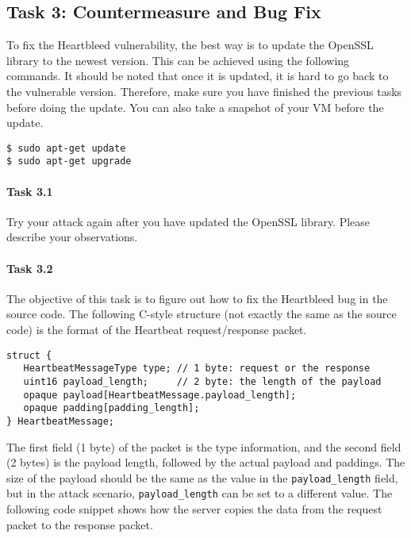 \subsection{Task 3: Countermeasure and Bug Fix}

To fix the Heartbleed vulnerability, the best way is to update the OpenSSL
library to the newest version. This can be achieved using the following commands. 
It should be noted that once it is updated, it is hard to go back to the
vulnerable version. Therefore, make sure you have finished the previous
tasks before doing the update. You can also take a snapshot of your VM
before the update.


\begin{lstlisting}
$ sudo apt-get update
$ sudo apt-get upgrade
\end{lstlisting}


\paragraph{Task 3.1} Try your attack again after you have updated the
OpenSSL library. Please describe your observations. 



\paragraph{Task 3.2} The objective of this task is to figure out how to fix
the Heartbleed bug in the source code. The following C-style structure (not
exactly the same as the source code) is the format of the Heartbeat 
request/response packet. 


\begin{lstlisting}
struct {
   HeartbeatMessageType type; // 1 byte: request or the response
   uint16 payload_length;     // 2 byte: the length of the payload
   opaque payload[HeartbeatMessage.payload_length]; 
   opaque padding[padding_length]; 
} HeartbeatMessage;
\end{lstlisting}


The first field (1 byte) of the packet is the type information, 
and the second field (2 bytes) is the payload length, followed by the 
actual payload and paddings. The size of the payload should be the same as
the value in the \texttt{payload\_length} field, but in the attack
scenario, \texttt{payload\_length} can be set to a different value. The
following code snippet shows how the server 
copies the data from the request packet to the response packet. 



